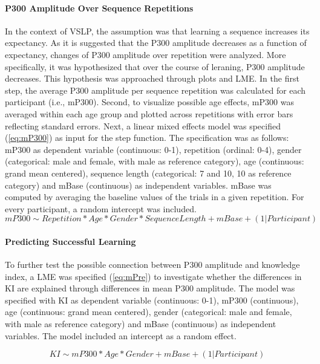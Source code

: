 \paragraph{P300 Amplitude Over Sequence Repetitions}
In the context of VSLP, the assumption was that learning a sequence increases its expectancy. As it is suggested that the P300 amplitude decreases as a function of expectancy, changes of P300 amplitude over repetition were analyzed. More specifically, it was hypothesized that over the course of leraning, P300 amplitude decreases. This hypothesis was approached through plots and LME. In the first step, the average P300 amplitude per sequence repetition was calculated for each participant (i.e., mP300). Second, to visualize possible age effects, mP300 was averaged within each age group and plotted across repetitions with error bars reflecting standard errors. Next, a linear mixed effects model was specified (\ref{eq:mP300}) as input for the step function. The specification was as follows: mP300 as dependent variable (continuous: 0-1), repetition (ordinal: 0-4), gender (categorical: male and female, with male as reference category), age (continuous: grand mean centered), sequence length (categorical: 7 and 10, 10 as reference category) and mBase (continuous) as independent variables. mBase was computed by averaging the baseline values of the trials in a given repetition. For every participant, a random intercept was included. 
\begin{equation}\label{eq:mP300}
mP300 \sim Repetition*Age*Gender*SequenceLength + mBase + (1| Participant)
\end{equation}

\paragraph{Predicting Successful Learning}
To further test the possible connection between P300 amplitude and knowledge index, a LME was specified (\ref{eq:mPre}) to investigate whether the differences in KI are explained through differences in mean P300 amplitude. The model was specified with KI as dependent variable (continuous: 0-1), mP300 (continuous), age (continuous: grand mean centered), gender (categorical: male and female, with male as reference category) and mBase (continuous) as independent variables. The model included an intercept as a random effect.

\begin{equation}\label{eq:mPre}
KI \sim mP300*Age*Gender +  mBase + (1 | Participant)
\end{equation}

